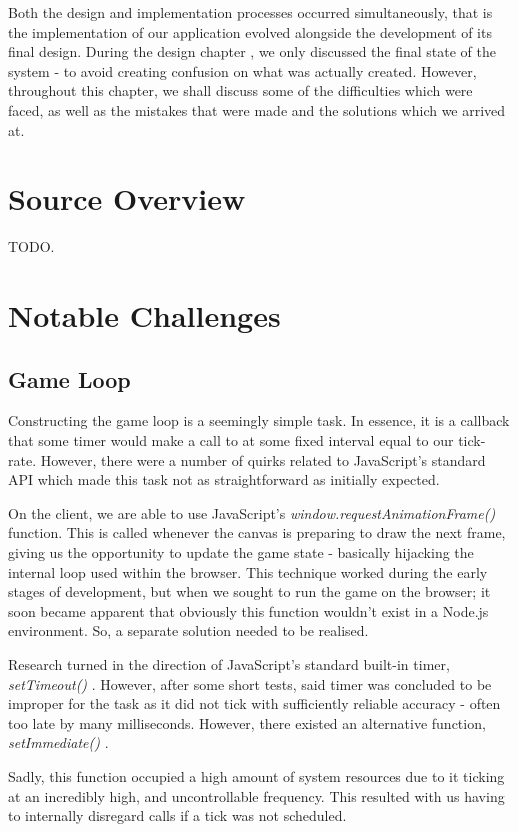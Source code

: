 \documentclass{standalone}
\begin{document}
	Both the design and implementation processes occurred simultaneously, that is the implementation of our application evolved alongside the development of its final design. During the design chapter , we only discussed the final state of the system - to avoid creating confusion on what was actually created. However, throughout this chapter, we shall discuss some of the difficulties which were faced, as well as the mistakes that were made and the solutions which we arrived at.

	\section{Source Overview}
		TODO.

	\section{Notable Challenges}
		\subsection{Game Loop}
			Constructing the game loop is a seemingly simple task. In essence, it is a callback that some timer would make a call to at some fixed interval equal to our tick-rate. However, there were a number of quirks related to JavaScript's standard API which made this task not as straightforward as initially expected.

			On the client, we are able to use JavaScript's \emph{window.requestAnimationFrame()} \parencite{JsRequestAnimationFrame} function. This is called whenever the canvas is preparing to draw the next frame, giving us the opportunity to update the game state - basically hijacking the internal loop used within the browser. This technique worked during the early stages of development, but when we sought to run the game on the browser; it soon became apparent that obviously this function wouldn't exist in a Node.js environment. So, a separate solution needed to be realised.

			Research turned in the direction of JavaScript's standard built-in timer, \emph{setTimeout()} \parencite{JsSetTimeout}. However, after some short tests, said timer was concluded to be improper for the task as it did not tick with sufficiently reliable accuracy - often too late by many milliseconds. However, there existed an alternative function, \emph{setImmediate()} \parencite{JsSetImmediate}. 

			Sadly, this function occupied a high amount of system resources due to it ticking at an incredibly high, and uncontrollable frequency. This resulted with us having to internally disregard calls if a tick was not scheduled.
\end{document}
